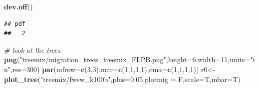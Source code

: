 \documentclass[]{article}
\newenvironment{Shaded}{\begin{snugshade}}{\end{snugshade}}
\newcommand{\KeywordTok}[1]{\textcolor[rgb]{0.13,0.29,0.53}{\textbf{#1}}}
\newcommand{\DataTypeTok}[1]{\textcolor[rgb]{0.13,0.29,0.53}{#1}}
\newcommand{\DecValTok}[1]{\textcolor[rgb]{0.00,0.00,0.81}{#1}}
\newcommand{\FloatTok}[1]{\textcolor[rgb]{0.00,0.00,0.81}{#1}}
\newcommand{\StringTok}[1]{\textcolor[rgb]{0.31,0.60,0.02}{#1}}
\newcommand{\CommentTok}[1]{\textcolor[rgb]{0.56,0.35,0.01}{\textit{#1}}}
\newcommand{\NormalTok}[1]{#1}
\begin{document}
\begin{Shaded}
\begin{Highlighting}[]
\KeywordTok{dev.off}\NormalTok{()}
\end{Highlighting}
\end{Shaded}

\begin{verbatim}
## pdf 
##   2
\end{verbatim}

\begin{Shaded}
\begin{Highlighting}[]
\CommentTok{# look at the trees}
\KeywordTok{png}\NormalTok{(}\StringTok{"treemix/migration_trees_treemix_FLPB.png"}\NormalTok{,}\DataTypeTok{height=}\DecValTok{6}\NormalTok{,}\DataTypeTok{width=}\DecValTok{11}\NormalTok{,}\DataTypeTok{units=}\StringTok{"in"}\NormalTok{,}\DataTypeTok{res=}\DecValTok{300}\NormalTok{)}
\KeywordTok{par}\NormalTok{(}\DataTypeTok{mfrow=}\KeywordTok{c}\NormalTok{(}\DecValTok{3}\NormalTok{,}\DecValTok{3}\NormalTok{),}\DataTypeTok{mar=}\KeywordTok{c}\NormalTok{(}\DecValTok{1}\NormalTok{,}\DecValTok{1}\NormalTok{,}\DecValTok{1}\NormalTok{,}\DecValTok{1}\NormalTok{),}\DataTypeTok{oma=}\KeywordTok{c}\NormalTok{(}\DecValTok{1}\NormalTok{,}\DecValTok{1}\NormalTok{,}\DecValTok{1}\NormalTok{,}\DecValTok{1}\NormalTok{))}
\NormalTok{r0<-}\KeywordTok{plot_tree}\NormalTok{(}\StringTok{"treemix/fwsw_k100b"}\NormalTok{,}\DataTypeTok{plus=}\FloatTok{0.05}\NormalTok{,}\DataTypeTok{plotmig =}\NormalTok{ F,}\DataTypeTok{scale=}\NormalTok{T,}\DataTypeTok{mbar=}\NormalTok{T)}
\end{Highlighting}
\end{Shaded}
\end{document}
